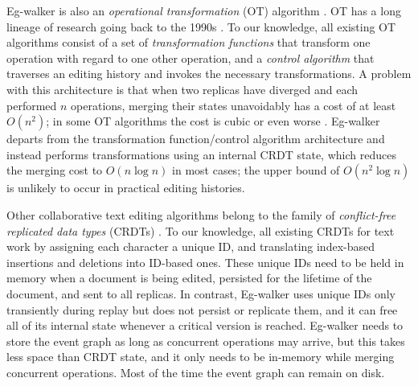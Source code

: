 \documentclass[sigplan,10pt]{acmart}
\newcommand{\algname}{Eg-walker\xspace}
\begin{document}
\algname is also an \emph{operational transformation} (OT) algorithm \cite{Ellis1989}. %
OT has a long lineage of research going back to the 1990s \cite{Nichols1995,Ressel1996,Sun1998}.
To our knowledge, all existing OT algorithms consist of a set of \emph{transformation functions} that transform one operation with regard to one other operation, and a \emph{control algorithm} that traverses an editing history and invokes the necessary transformations.
A problem with this architecture is that when two replicas have diverged and each performed $n$ operations, merging their states unavoidably has a cost of at least $O(n^2)$; in some OT algorithms the cost is cubic or even worse \cite{Li2006,Roh2011RGA,Sun2020OT}.
\algname departs from the transformation function/control algorithm architecture and instead performs transformations using an internal CRDT state, which reduces the merging cost to $O(n \log n)$ in most cases; the upper bound of $O(n^2 \log n)$ is unlikely to occur in practical editing histories.


Other collaborative text editing algorithms \cite{Preguica2009,Roh2011RGA,fugue,Weiss2010} belong to the family of \emph{conflict-free replicated data types} (CRDTs) \cite{Shapiro2011}.
To our knowledge, all existing CRDTs for text work by assigning each character a unique ID, and translating index-based insertions and deletions into ID-based ones.
These unique IDs need to be held in memory when a document is being edited, persisted for the lifetime of the document, and sent to all replicas.
In contrast, \algname uses unique IDs only transiently during replay but does not persist or replicate them, and it can free all of its internal state whenever a critical version is reached.
\algname needs to store the event graph as long as concurrent operations may arrive, but this takes less space than CRDT state, and it only needs to be in-memory while merging concurrent operations.
Most of the time the event graph can remain on disk.
\end{document}
